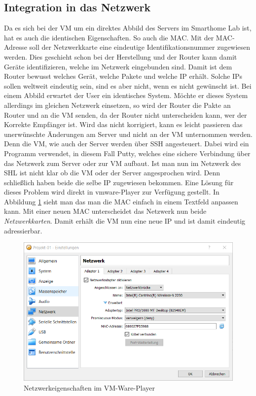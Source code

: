 \subsection{Integration in das Netzwerk}
Da es sich bei der \ac{VM} um ein direktes Abbild des Servers im Smarthome Lab ist, hat es auch die identischen Eigenschaften. So auch die \ac{MAC}. Mit der \ac{MAC}-Adresse soll der Netzwerkkarte eine eindeutige Identifikationsnummer zugewiesen werden. Dies geschieht schon bei der Herstellung und der Router kann damit Geräte identifizieren, welche im Netzwerk eingebunden sind. Damit ist dem Router bewusst welches Gerät, welche Pakete und welche \ac{IP} erhält. \autocite{Zisler.2016} Solche \acp{IP} sollen weltweit eindeutig sein, sind es aber nicht, wenn es nicht gewünscht ist. Bei einem Abbild erwartet der User ein identisches System. Möchte er dieses System allerdings im gleichen Netzwerk einsetzen, so wird der Router die Pakte an Router und an die \ac{VM} senden, da der Router nicht unterscheiden kann, wer der Korrekte Empfänger ist. Wird das nicht korrigiert, kann es leicht passieren das unerwünschte Änderungen am Server und nicht an der \ac{VM} unternommen werden. Denn die \ac{VM}, wie auch der Server werden über \ac{SSH} angesteuert. Dabei wird ein Programm verwendet, in diesem Fall Putty, welches eine sichere Verbindung über das Netzwerk zum Server oder zur \ac{VM} aufbaut. Ist man nun im Netzwerk des \ac{SHL} ist nicht klar ob die \ac{VM} oder der Server angesprochen wird. Denn schließlich haben beide die selbe \ac{IP} zugewiesen bekommen. Eine Lösung für dieses Problem wird direkt in vmware-Player zur Verfügung gestellt. In Abbildung \ref{fig:vmwaremac} sieht man das man die \acl{MAC} einfach in einem Textfeld anpassen kann. Mit einer neuen \acl{MAC} unterscheidet das Netzwerk nun beide \textit{Netzwerkkarten}. Damit erhält die \acl{VM} nun eine neue \ac{IP} und ist damit eindeutig adressierbar.

\begin{figure}[bh]
	\centering
	
	\includegraphics[scale=0.6]{content/pictures/macadresse.png}
	\caption{ Netzwerkeigenschaften im  VM-Ware-Player}
	\label{fig:vmwaremac}
\end{figure}


